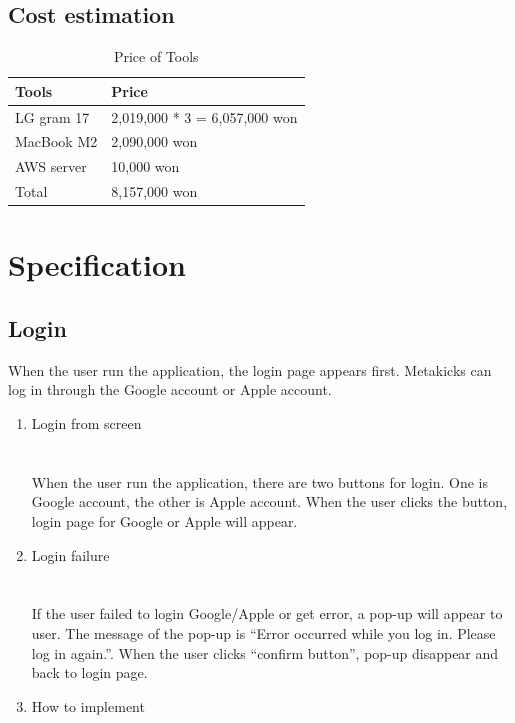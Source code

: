 \documentclass[conference]{IEEEtran}
\begin{document}
\subsection{Cost estimation}
\begin{table}[h]
\caption{Price of Tools}
\def\arraystretch{1.25} \small
    \begin{tabular}{|p{2.4cm}|p{5.0cm}|}
	\hline
	Tools & Price\\
       \hline
       LG gram 17 & 2,019,000 * 3 = 6,057,000 won\\
	\hline
       MacBook M2 & 2,090,000 won\\
	\hline
       AWS server & 10,000 won\\
	\hline
	Total & 8,157,000 won\\
	\hline
	\end{tabular}
\end{table}
\section{Specification}

\subsection{Login}
When the user run the application, the login page appears first. Metakicks can log in through the Google account or Apple account. \\
\begin{enumerate}
    \item Login from screen\\\\
\\When the user run the application, there are two buttons for login. One is Google account, the other is Apple account. When the user clicks the button, login page for Google or Apple will appear. \\

    \item Login failure\\\\
\\If the user failed to login Google/Apple or get error, a pop-up will appear to user. The message of the pop-up is “Error occurred while you log in. Please log in again.”. When the user clicks “confirm button”, pop-up disappear and back to login page.\\
    \item How to implement\\
\end{enumerate}
\end{document}
